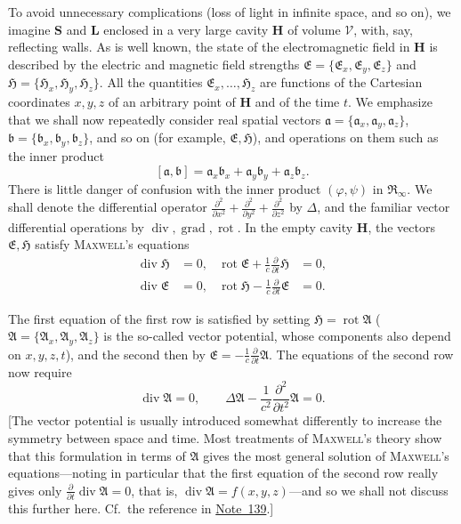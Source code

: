 \documentclass[fontsize=13pt,twoside,openany,headings=normal,parskip=false,bookmarkpackage=false,DIV=calc]{scrbook}
\begin{document}
To avoid unnecessary complications (loss of light in infinite space, and so on), we imagine $\boldsymbol{S}$ and $\boldsymbol{L}$ enclosed in a very large cavity $\boldsymbol H$ of volume $\mathcal V$, with, say, reflecting walls. As is well known, the state of the electromagnetic field in $\boldsymbol H$ is described by the electric and magnetic field strengths $\mathfrak E=\{\mathfrak E_x,\mathfrak E_y,\mathfrak E_z\}$ and $\mathfrak H=\{\mathfrak H_x,\mathfrak H_y,\mathfrak H_z\}$. All the quantities $\mathfrak E_x,\ldots,\mathfrak H_z$ are functions of the Cartesian coordinates $x,y,z$ of an arbitrary point of $\boldsymbol H$ and of the time $t$. We emphasize that we shall now repeatedly consider real spatial vectors $\mathfrak a=\{\mathfrak a_x,\mathfrak a_y,\mathfrak a_z\}$, $\mathfrak b=\{\mathfrak b_x,\mathfrak b_y,\mathfrak b_z\}$, and so on (for example, $\mathfrak E,\mathfrak H$), and operations on them such as the inner product
\[
 [\mathfrak a,\mathfrak b]=\mathfrak a_x\mathfrak b_x+\mathfrak a_y\mathfrak b_y+\mathfrak a_z\mathfrak b_z.
\]
There is little danger of confusion with the inner product $(\varphi,\psi)$ in $\mathfrak R_\infty$. We shall denote the differential operator $\frac{\partial^2}{\partial x^2}+\frac{\partial^2}{\partial y^2}+\frac{\partial^2}{\partial z^2}$ by $\Delta$, and the familiar vector differential operations by $\operatorname{div},\operatorname{grad},\operatorname{rot}$. In the empty cavity $\boldsymbol H$, the vectors $\mathfrak E,\mathfrak H$ satisfy \textsc{Maxwell}'s equations
\hypertarget{origpage-137}{}%
\begin{align*}
 \operatorname{div}\mathfrak H&=0,&
 \operatorname{rot}\mathfrak E+\frac1c\frac{\partial}{\partial t}\mathfrak H&=0,\\
 \operatorname{div}\mathfrak E&=0,&
 \operatorname{rot}\mathfrak H-\frac1c\frac{\partial}{\partial t}\mathfrak E&=0.
\end{align*}

The first equation of the first row is satisfied by setting $\mathfrak H=\operatorname{rot}\mathfrak A$ ($\mathfrak A=\{\mathfrak A_x,\mathfrak A_y,\mathfrak A_z\}$ is the so-called vector potential, whose components also depend on $x,y,z,t$), and the second then by $\mathfrak E=-\frac1c\frac{\partial}{\partial t}\mathfrak A$. The equations of the second row now require
\begin{equation}
 \operatorname{div}\mathfrak A=0,\qquad
 \Delta\mathfrak A-\frac1{c^2}\frac{\partial^2}{\partial t^2}\mathfrak A=0.
 \tag{A}\label{eq:III.6.A}
\end{equation}
[The vector potential is usually introduced somewhat differently to increase the symmetry between space and time. Most treatments of \textsc{Maxwell}'s theory show that this formulation in terms of $\mathfrak A$ gives the most general solution of \textsc{Maxwell}'s equations---noting in particular that the first equation of the second row really gives only $\frac{\partial}{\partial t}\operatorname{div}\mathfrak A=0$, that is, $\operatorname{div}\mathfrak A=f(x,y,z)$---and so we shall not discuss this further here. Cf.\ the reference in \hyperlink{note-139}{Note~139}.]
\end{document}
